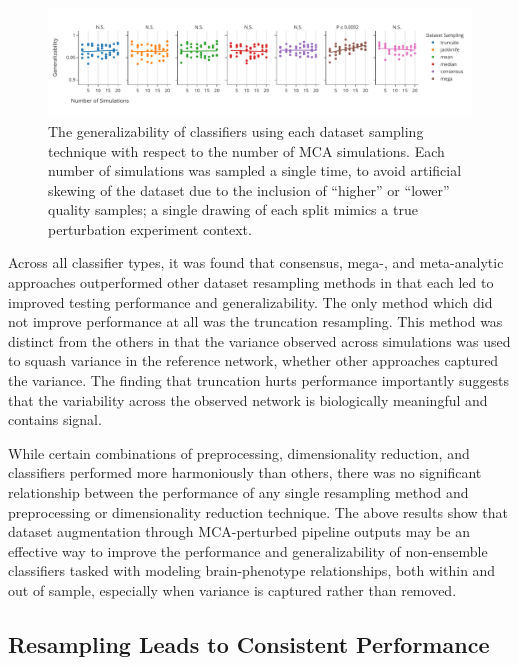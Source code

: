 \documentclass[10pt]{SelfArx} %
\begin{document}
\begin{figure}[ht]\centering
\includegraphics[width=\linewidth]{figures/3.pdf}
\caption{The generalizability of classifiers using each dataset sampling technique with respect to the number of MCA
simulations. Each number of simulations was sampled a single time, to avoid artificial skewing of the dataset due to
the inclusion of ``higher'' or ``lower'' quality samples; a single drawing of each split mimics a true perturbation
experiment context.}
\label{fig:nmca}
\end{figure}


Across all classifier types, it was found that consensus, mega-, and meta-analytic approaches outperformed other
dataset resampling methods in that each led to improved testing performance and generalizability. The only method which
did not improve performance at all was the truncation resampling. This method was distinct from the others in that the
variance observed across simulations was used to squash variance in the reference network, whether other approaches
captured the variance. The finding that truncation hurts performance importantly suggests that the variability across
the observed network is biologically meaningful and contains signal.

While certain combinations of preprocessing, dimensionality reduction, and classifiers performed more harmoniously than
others, there was no significant relationship between the performance of any single resampling method and preprocessing
or dimensionality reduction technique. The above results show that dataset augmentation through MCA-perturbed pipeline
outputs may be an effective way to improve the performance and generalizability of non-ensemble classifiers tasked with
modeling brain-phenotype relationships, both within and out of sample, especially when variance is captured rather than
removed.

\subsection*{Resampling Leads to Consistent Performance}
\end{document}
